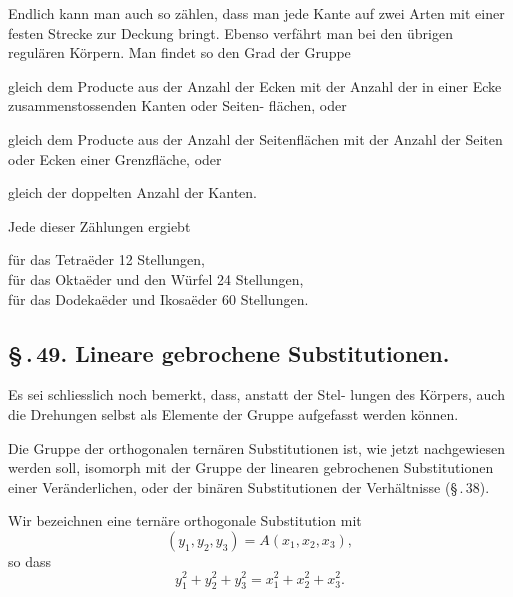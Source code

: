 \documentclass[12pt,a4paper]{article}
\theoremstyle{plain}
\theoremstyle{definition}
\theoremstyle{remark}
\newcommand{\sect}[1]{\S\,.\,#1.}
\begin{document}
Endlich kann man auch so z\"ahlen, dass man jede Kante
auf zwei Arten mit einer festen Strecke zur Deckung bringt.
Ebenso verf\"ahrt man bei den \"ubrigen regul\"aren K\"orpern. Man
findet so den Grad der Gruppe

gleich dem Producte aus der Anzahl der Ecken mit der Anzahl
der in einer Ecke zusammenstossenden Kanten oder Seiten-
fl\"achen, oder

gleich dem Producte aus der Anzahl der Seitenfl\"achen mit der
Anzahl der Seiten oder Ecken einer Grenzfl\"ache, oder

gleich der doppelten Anzahl der Kanten.

Jede dieser Z\"ahlungen ergiebt

f\"ur das Tetra\"eder 12 Stellungen,\\
f\"ur das Okta\"eder und den W\"urfel 24 Stellungen,\\
f\"ur das Dodeka\"eder und Ikosa\"eder 60 Stellungen.


\subsection*{\sect{49} Lineare gebrochene Substitutionen.}

Es sei schliesslich noch bemerkt, dass, anstatt der Stel-
lungen des K\"orpers, auch die Drehungen selbst als Elemente
der Gruppe aufgefasst werden k\"onnen.

Die Gruppe der orthogonalen tern\"aren Substitutionen ist,
wie jetzt nachgewiesen werden soll, isomorph mit der Gruppe
der linearen gebrochenen Substitutionen einer Ver\"anderlichen,
oder der bin\"aren Substitutionen der Verh\"altnisse (\S\,.\,38).

Wir bezeichnen eine tern\"are orthogonale Substitution mit
\begin{equation}\label{eq:49_1}
(y_1, y_2, y_3) = A(x_1, x_2, x_3),\tag{1}
\end{equation}
so dass
\begin{equation}\label{eq:49_2}
y_1^2 + y_2^2 + y_3^2 = x_1^2 + x_2^2 + x_3^2.\tag{2}
\end{equation}
\end{document}
